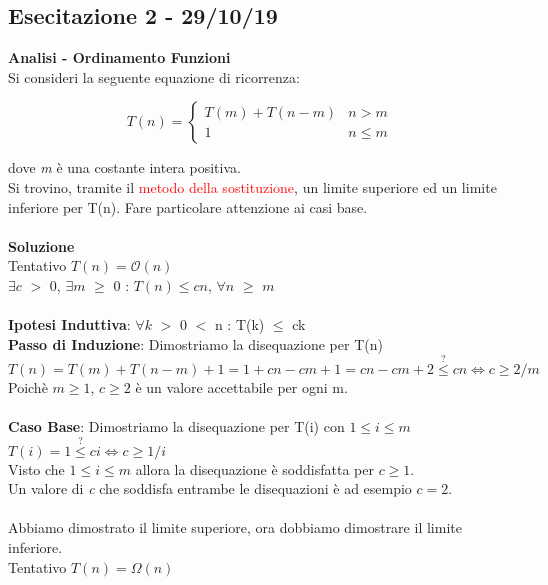 \documentclass[../cheatSheetAlgoritmi.tex]{subfiles}
\begin{document}
\subsection{Esecitazione 2 - 29/10/19}
\textbf{Analisi - Ordinamento Funzioni}\\
Si consideri la seguente equazione di ricorrenza:
\begin{center}
	\begin{equation*}
  		T(n)=\begin{cases}
			T(m) +  T(n - m) & \text{$n > m$}\\
			1 & \text{$n \leq m$}	
  		\end{cases}
	\end{equation*}
\end{center}
dove \textit{m} è una costante intera positiva.\\
Si trovino, tramite il \textcolor{red}{metodo della sostituzione}, un limite superiore ed un limite inferiore per T(n). Fare particolare attenzione ai casi base.\\\\
\textbf{Soluzione}\\
Tentativo $T(n) = \mathcal{O}(n)$\\
$\exists c$ $>$ 0, $\exists m$ $\geq$ 0 : $T(n) \leq cn$, $\forall n$ $\geq$ $m$\\\\
\textbf{Ipotesi Induttiva}: $\forall k$ $>$ 0 $<$ n : T(k) $\leq$ ck\\
\textbf{Passo di Induzione}: Dimostriamo la disequazione per T(n)\\
$T(n) = T(m) + T(n-m) + 1 = 1 + cn - cm + 1 = cn - cm + 2 \stackrel{?}{\leq} cn \iff c \geq 2/m$\\
Poichè $m \geq 1$, $c \geq 2$ è un valore accettabile per ogni m.\\\\
\textbf{Caso Base}: Dimostriamo la disequazione per T(i) con $1 \leq i \leq m$\\
$T(i) = 1 \stackrel{?}{\leq} ci \iff c \geq 1/i$\\
Visto che $1 \leq i \leq m$ allora la disequazione è soddisfatta per $c \geq 1$.\\
Un valore di \textit{c} che soddisfa entrambe le disequazioni è ad esempio $c = 2$.\\\\
Abbiamo dimostrato il limite superiore, ora dobbiamo dimostrare il limite inferiore.\\
Tentativo $T(n) = \Omega(n)$\\
\end{document}
